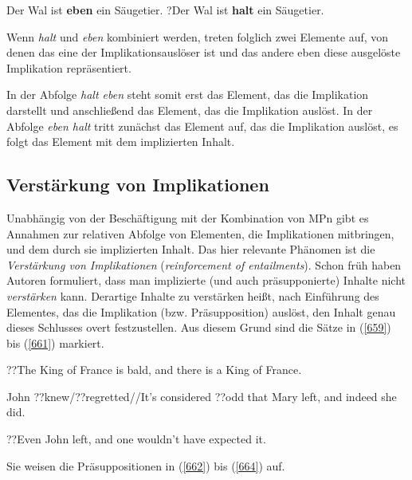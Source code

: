 \begin{exe}
	\ex\label{658} 
		\begin{xlist}	
			\ex\label{658a} Der Wal ist \textbf{eben} ein Säugetier.
			\ex\label{658b} ?Der Wal ist \textbf{halt} ein Säugetier.
		\end{xlist}
\end{exe}
Wenn \textit{halt} und \textit{eben} kombiniert werden, treten folglich zwei Elemente auf, von denen das eine der Implikationsauslöser ist und das andere eben diese ausgelöste Implikation repräsentiert.

In der Abfolge \textit{halt eben} steht somit erst das Element, das die Implikation darstellt und anschließend das Element, das die Implikation auslöst. In der Abfolge \textit{eben halt} tritt zunächst das Element auf, das die Implikation auslöst, es folgt das Element mit dem implizierten Inhalt.

\subsection{Verstärkung von Implikationen}
\label{sec:verstimpli}
Unabhängig von der Beschäftigung mit der Kombination von MPn gibt es Annahmen zur relativen Abfolge von Elementen, die Implikationen mitbringen, und dem durch sie implizierten Inhalt. Das hier relevante Phänomen ist die \textit{Verstärkung von Implikationen} (\textit{reinforcement of entailments}). Schon früh haben Autoren formuliert, dass man implizierte  (und auch präsupponierte)  Inhalte nicht \textit{verstärken} kann. Derartige Inhalte zu verstärken heißt, nach Einführung des Elementes, das die Implikation  (bzw. Präsupposition)  auslöst, den Inhalt genau dieses Schlusses overt festzustellen. Aus diesem Grund sind die Sätze in (\ref{659}) bis (\ref{661}) markiert.

\begin{exe}
	\ex\label{659} 
	??The King of France is bald, and there is a King of France.
\end{exe}

\begin{exe}
	\ex\label{660} 
	John ??knew/??regretted//It’s considered ??odd that Mary left, and indeed she did.
\end{exe}

\begin{exe}
	\ex\label{661} 
	??Even John left, and one wouldn’t have expected it. 
	\hfill\hbox{\citet[64/64/66]{Horn1976}}
\end{exe}											         
Sie weisen die Präsuppositionen in (\ref{662}) bis (\ref{664}) auf.

